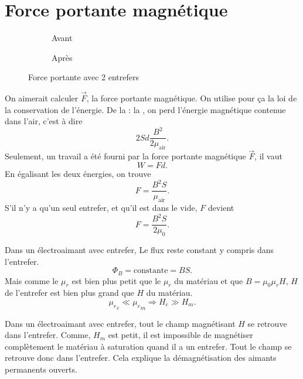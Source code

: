 \section{Force portante magnétique}
\begin{figure}[!ht]
  \begin{subfigure}{0.5\textwidth}
    \caption{Avant}
    \label{fig:before_portance}
  \end{subfigure}
  \begin{subfigure}{0.5\textwidth}
    \caption{Après}
    \label{fig:after_portance}
  \end{subfigure}
  \caption{Force portante avec 2 entrefers}
\end{figure}
On aimerait calculer $\vec F$, la force portante magnétique.
On utilise pour ça la loi de la conservation de l'énergie.
De la  : la ,
on perd l'énergie magnétique contenue dans l'air,
c'est à dire
\[ 2Sd\frac{B^2}{2\mu_\mathrm{air}}. \]
Seulement, un travail a été fourni par la force portante magnétique $\vec F$,
il vaut
\[ W = Fd. \]
En égalisant les deux énergies, on trouve
\[ F = \frac{B^2S}{\mu_\mathrm{air}}. \]
S'il n'y a qu'un seul entrefer, et qu'il est dans le vide, $F$ devient
\[ F = \frac{B^2S}{2\mu_0}. \]

Dans un électroaimant avec entrefer,
Le flux reste constant y compris dans l'entrefer.
\[ \Phi_B = \text{constante} = BS. \]
Mais comme le $\mu_r$ est bien plus petit que le $\mu_r$ du matériau
et que $B = \mu_0\mu_r H$,
$H$ de l'entrefer est bien plus grand que $H$ du matériau.
\[ {\mu_r}_e \ll {\mu_r}_m \Rightarrow H_e \gg H_m. \]

Dans un électroaimant avec entrefer,
tout le champ magnétisant $H$ se retrouve dans l'entrefer.
Comme, $H_m$ est petit,
il est impossible de magnétiser complètement le
matériau à saturation quand il a un entrefer.
Tout le champ se retrouve donc dans l'entrefer.
Cela explique la démagnétisation des aimants permanents ouverts.


